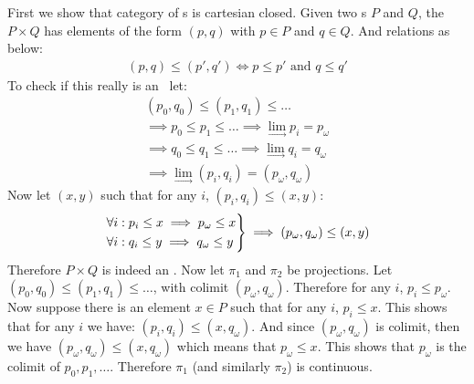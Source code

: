
        First we show that category of \wcpo s is cartesian closed.
        Given two \wcpo s $P$ and $Q$, the \wcpo\ $P \times Q$ has elements of the form $(p, q)$ with $p \in P$ and $q \in Q$. And relations as below:
        \begin{gather*}
            (p, q) \le (p', q') \iff p \le p' \text{ and } q \le q'
        \end{gather*}
        To check if this really is an \wcpo\ let:
        \begin{gather*}
            (p_0, q_0) \le (p_1, q_1) \le \dots \\
            \implies p_0 \le p_1 \le \dots \implies \lim_{\to}p_i = p_\omega \\
            \implies q_0 \le q_1 \le \dots \implies \lim_{\to}q_i = q_\omega \\
            \implies \lim_{\to}(p_i, q_i) = (p_\omega, q_\omega)
        \end{gather*}
        Now let $(x, y)$ such that for any $i$, $(p_i, q_i) \le (x, y)$:
        \begin{gather*}
            \begin{rcases}
                \forall i :p_i \le x \implies p_\omega \le x \\
                \forall i :q_i \le y \implies q_\omega \le y \\
            \end{rcases}
            \implies (p_\omega, q_\omega) \le (x, y) 
        \end{gather*}
        Therefore $P \times Q$ is indeed an \wcpo . Now let $\pi_1$ and $\pi_2$ be projections. Let $(p_0, q_0) \le (p_1, q_1) \le \dots$, with colimit $(p_\omega, q_\omega)$. 
        Therefore for any $i$, $p_i \le p_\omega$. Now suppose there is an element $x \in P$ such that for any $i$, $p_i \le x$.
        This shows that for any $i$ we have: $(p_i, q_i) \le (x, q_\omega)$. And since $(p_\omega, q_\omega)$ is colimit, then we have $(p_\omega, q_\omega) \le (x, q_\omega)$ which means that $p_\omega \le x$. 
        This shows that $p_\omega$ is the colimit of $p_0, p_1, \dots$. Therefore $\pi_1$ (and similarly $\pi_2$) is continuous.
        \begin{center}
        \end{center}
